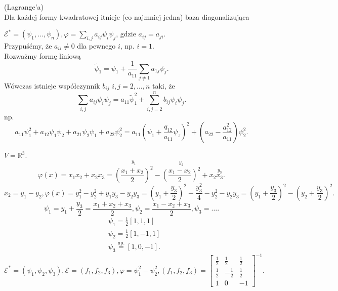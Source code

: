 \documentclass[../main.tex]{subfiles}
\begin{document}
    \begin{tw}
        (Lagrange'a)\\
        Dla każdej formy kwadratowej itnieje (co najmniej jedna) baza diagonalizująca
    \end{tw}
    \begin{dowod}
        $\mathcal{E}^* = \left( \psi_1,\ldots,\psi_n \right) , \varphi = \sum_{i,j} a_{ij} \psi_i \psi_j$, gdzie $a_{ij} = a_{ji}$.\\
        Przypuśćmy, że $a_{ii}\neq 0$ dla pewnego $i$, np. $i = 1$.\\
        Rozważmy formę liniową
        \[
        \tilde \psi_1 = \psi_1 + \frac{1}{a_{11}}\sum_{j\neq 1} a_{1j}\psi_j
        .\]
        Wówczas istnieje współczynnik $b_{ij}$ $i,j=2,\ldots,n$ taki, że
        \[
        \sum_{i,j} a_{ij}\psi_i \psi_j = a_{11} \tilde \psi_1^2 + \sum_{i,j=2}^n b_{ij}\psi_i \psi_j
        .\]
        np.\[
            a_{11}\psi_1^2 + a_{12}\psi_1\psi_2 + a_{21}\psi_2\psi_1 + a_{22}\psi_2^2 = a_{11}(\psi_1 + \frac{q_{12}}{a_{11}}\psi_z)^2 + (a_{22} - \frac{a_{12}^2}{a_{11}})\psi_2^2
        .\]
    \end{dowod}
    \begin{przyklad}
        $V=\mathbb{R}^3$.
        \[
            \varphi(x) = x_1x_2 + x_2x_3 = \overset{y_1}{\left(\frac{x_1+x_2}{2}\right)^2} - \overset{y_2}{\left( \frac{x_1-x_2}{2} \right) ^2} + x_2\overset{y_3}{x_3}
        .\]
        \[
            x_2 = y_1-y_2, \varphi(x) = y_1^2 - y_2^2 + y_1y_3 - y_2y_3 = (y_1+\frac{y_3}{2})^2 - \frac{y_3^2}{4} - y_2^2 - y_2y_3 = (y_1+\frac{y_3}{2})^2 - (y_2+\frac{y_3}{2})^2
        .\]
        \[
            \psi_1 = y_1+\frac{y_3}{2} = \frac{x_1+x_2+x_3}{2}, \psi_2 = \frac{x_1-x_2+x_3}{2}, \psi_3 = \ldots
        .\]
        \begin{align*}
            &\psi_1 = \frac{1}{2}\left[ 1,1,1 \right] \\
            &\psi_2 = \frac{1}{2}\left[ 1,-1,1 \right] \\
            &\psi_3 \overset{\text{np.}}{=} \left[ 1,0,-1 \right]
        .\end{align*}
        \[
            \mathcal{E}^* = \left( \psi_1, \psi_2, \psi_3 \right) , \mathcal{E} = \left( f_1,f_2,f_3 \right) , \varphi = \psi_1^2 - \psi_2^2, \left( f_1,f_2,f_3 \right) = \begin{bmatrix} \frac{1}{2}&\frac{1}{2}&\frac{1}{2}\\ \frac{1}{2}&-\frac{1}{2}&\frac{1}{2}\\ 1&0&-1 \end{bmatrix} ^{-1}
        .\]
    \end{przyklad}
\end{document}
